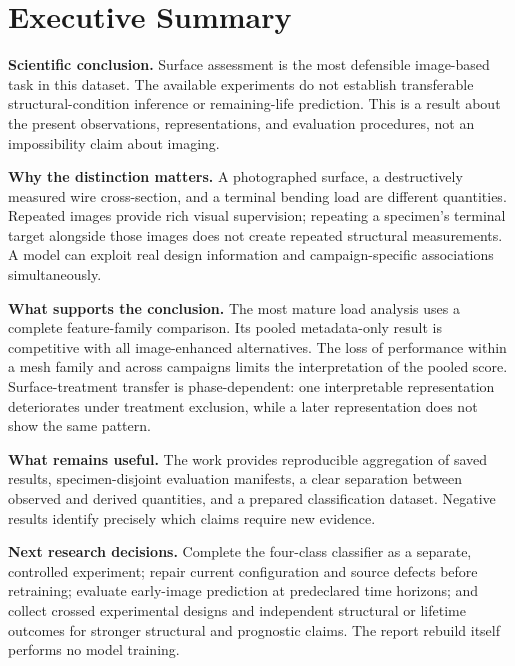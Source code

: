 \chapter*{Executive Summary}
\textbf{Scientific conclusion.} Surface assessment is the most defensible image-based task in this dataset. The available experiments do not establish transferable structural-condition inference or remaining-life prediction. This is a result about the present observations, representations, and evaluation procedures, not an impossibility claim about imaging.

\textbf{Why the distinction matters.} A photographed surface, a destructively measured wire cross-section, and a terminal bending load are different quantities. Repeated images provide rich visual supervision; repeating a specimen's terminal target alongside those images does not create repeated structural measurements. A model can exploit real design information and campaign-specific associations simultaneously.

\textbf{What supports the conclusion.} The most mature load analysis uses a complete feature-family comparison. Its pooled metadata-only result is competitive with all image-enhanced alternatives. The loss of performance within a mesh family and across campaigns limits the interpretation of the pooled score. Surface-treatment transfer is phase-dependent: one interpretable representation deteriorates under treatment exclusion, while a later representation does not show the same pattern.

\textbf{What remains useful.} The work provides reproducible aggregation of saved results, specimen-disjoint evaluation manifests, a clear separation between observed and derived quantities, and a prepared classification dataset. Negative results identify precisely which claims require new evidence.

\textbf{Next research decisions.} Complete the four-class classifier as a separate, controlled experiment; repair current configuration and source defects before retraining; evaluate early-image prediction at predeclared time horizons; and collect crossed experimental designs and independent structural or lifetime outcomes for stronger structural and prognostic claims. The report rebuild itself performs no model training.
